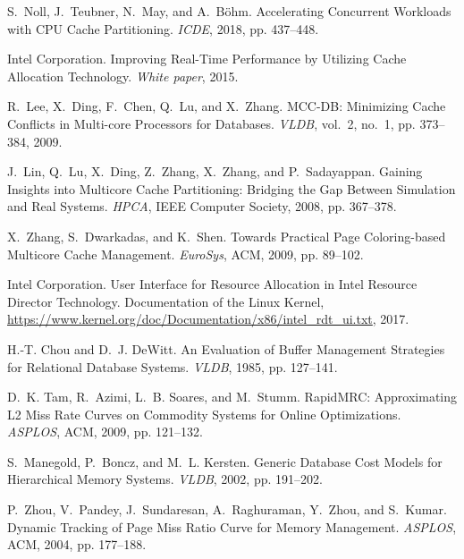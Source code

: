 \documentclass[11pt,dvipdfm]{article}
\begin{document}
\begin{thebibliography}{10}
\begin{small}
S.~Noll, J.~Teubner, N.~May, and A.~B\"{o}hm. \newblock Accelerating Concurrent Workloads with CPU Cache Partitioning. \newblock \emph{ICDE}, 2018,
pp. 437--448.

Intel Corporation. \newblock Improving Real-Time Performance by Utilizing Cache Allocation Technology. \newblock \emph{White paper}, 2015.

R.~Lee, X.~Ding, F.~Chen, Q.~Lu, and X.~Zhang. \newblock MCC-DB: Minimizing Cache Conflicts in Multi-core Processors for Databases. \newblock \emph{VLDB},
vol.~2, no.~1, pp. 373--384, 2009.

J.~Lin, Q.~Lu, X.~Ding, Z.~Zhang, X.~Zhang, and P.~Sadayappan. \newblock Gaining Insights into Multicore Cache Partitioning: Bridging the Gap Between Simulation and Real Systems. \newblock \emph{HPCA}, IEEE Computer Society, 2008, pp. 367--378.

X.~Zhang, S.~Dwarkadas, and K.~Shen. \newblock Towards Practical Page Coloring-based Multicore Cache Management. \newblock \emph{EuroSys}, ACM, 2009, pp. 89--102.

Intel Corporation. \newblock User Interface for Resource Allocation in Intel Resource Director Technology. \newblock Documentation of the Linux Kernel, \url{https://www.kernel.org/doc/Documentation/x86/intel_rdt_ui.txt}, 2017.

H.-T. Chou and D.~J. DeWitt. \newblock An Evaluation of Buffer Management Strategies for Relational Database Systems. \newblock \emph{VLDB}, 1985, pp. 127--141.

D.~K. Tam, R.~Azimi, L.~B. Soares, and M.~Stumm. \newblock RapidMRC: Approximating L2 Miss Rate Curves on Commodity Systems for Online Optimizations. \newblock \emph{ASPLOS}, ACM, 2009, pp.
121--132.

S.~Manegold, P.~Boncz, and M.~L. Kersten. \newblock Generic Database Cost Models for Hierarchical Memory Systems. \newblock \emph{VLDB}, 2002, pp. 191--202.

P.~Zhou, V.~Pandey, J.~Sundaresan, A.~Raghuraman, Y.~Zhou, and S.~Kumar. \newblock Dynamic Tracking of Page Miss Ratio Curve for Memory Management. \newblock \emph{ASPLOS}, ACM, 2004, pp.
177--188.


\end{small}
\end{thebibliography}
\end{document}
